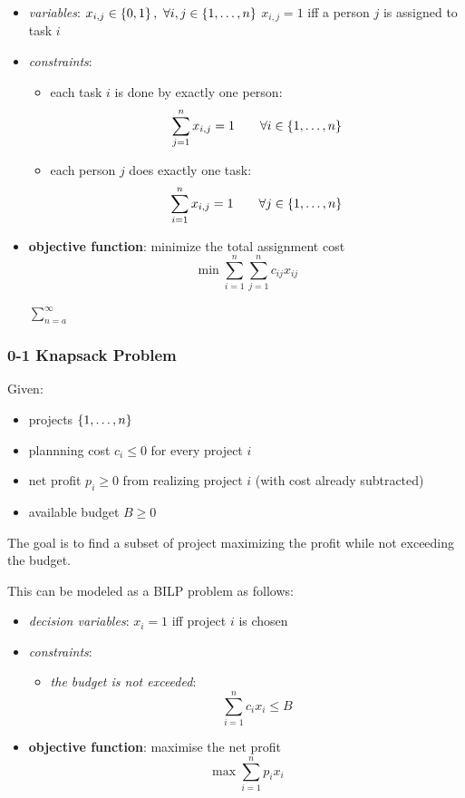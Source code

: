\documentclass[a4paper, 11pt]{report}
\begin{document}
\begin{itemize}
    \item \textit{variables}: $x_{i,j}\in \set{0,1}, \ \forall i,j \in \set{1, \dots, n}$
        \subitem $x_{i,j} = 1$ iff a person $j$ is assigned to task $i$
    \item \textit{constraints}: 
        \begin{itemize}
            \item each task $i$ is done by exactly one person:
                $$ \sum_{j=1}^{n} x_{i,j} = 1 \quad \quad \forall i \in \set{1, \dots, n} $$
            \item each person $j$ does exactly one task:
                $$ \sum_{i=1}^{n} x_{i,j} = 1 \quad \quad \forall j \in \set{1, \dots, n} $$
        \end{itemize}
    \item \textbf{objective function}: minimize the total assignment cost
        $$ \min \sum_{i=1}^{n} \sum_{j=1}^{n} c_{ij}x_{ij}  $$

        $\sum_{n=a}^{\infty} $
\end{itemize}


\subsubsection{0-1 Knapsack Problem}
Given:
\begin{itemize}
    \item projects $\set{1, \dots, n}$
    \item plannning cost $c_{i} \leq 0$ for every project $i$
    \item net profit $p_{i} \geq 0$ from realizing project $i$ (with cost already subtracted)
    \item available budget $B \geq 0$
\end{itemize}

The goal is to find a subset of project maximizing the profit while not exceeding the budget.

This can be modeled as a BILP problem as follows:
\begin{itemize}
    \item \textit{decision variables}: $x_{i} = 1$ iff project $i$ is chosen
    \item \textit{constraints}:
        \begin{itemize}
            \item \textit{the budget is not exceeded}:
                $$ \sum_{i=1}^{n} c_{i} x_{i} \leq B  $$
        \end{itemize}
    \item \textbf{objective function}: maximise the net profit
        $$\max \sum_{i=1}^{n} p_{i} x_{i} $$
\end{itemize}
\end{document}
